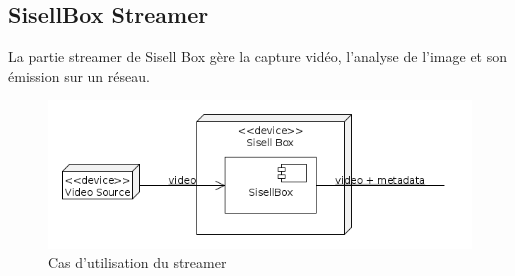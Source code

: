 \subsection{SisellBox Streamer}
La partie streamer de Sisell Box gère la capture vidéo, l'analyse de l'image et son émission sur un réseau.

\begin{figure}[!h]
  \centering
  \includegraphics[scale=0.7]{figures/sisell_box}
  \caption{Cas d'utilisation du streamer}
\end{figure}

